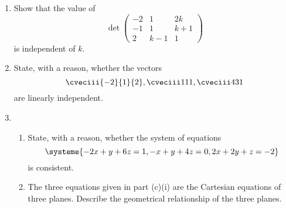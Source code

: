 \begin{problem}
    \begin{enumerate}
        \item Show that the value of \[\det \begin{pmatrix}-2 & 1 & 2k\\ -1 & 1 & k+1\\ 2 & k-1 & 1\end{pmatrix}\] is independent of $k$.
        \item State, with a reason, whether the vectors \[\cveciii{-2}{1}{2}, \cveciii111, \cveciii431\] are linearly independent.
        \item \begin{enumerate}
            \item State, with a reason, whether the system of equations \[\systeme{-2x+y+6z=1,-x+y+4z=0,2x+2y+z=-2}\] is consistent.
            \item The three equations given in part (c)(i) are the Cartesian equations of three planes. Describe the geometrical relationship of the three planes.
        \end{enumerate}
    \end{enumerate}
\end{problem}
\clearpage
